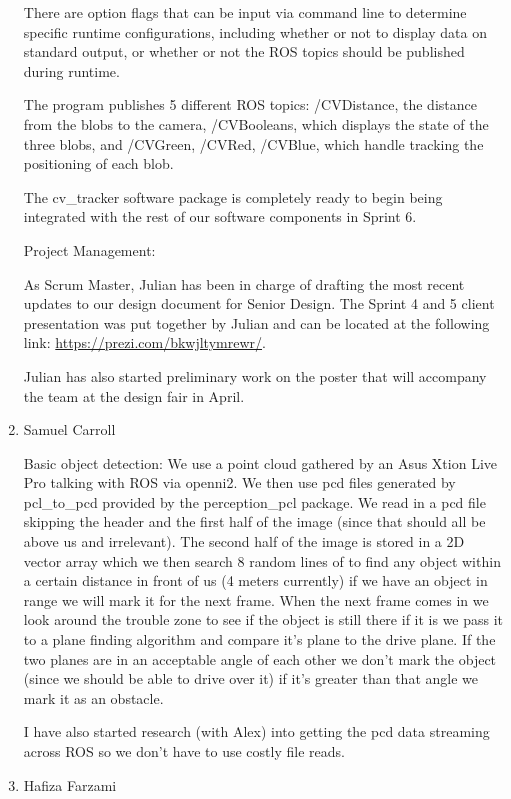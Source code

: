 \begin{enumerate}
There are option flags that can be input via command line to determine specific runtime configurations, including whether or not to display data on standard output, or whether or not the ROS topics should be published during runtime. 

The program publishes 5 different ROS topics:
/CVDistance, the distance from the blobs to the camera, /CVBooleans, which displays the state of the three blobs, and /CVGreen, /CVRed, /CVBlue, which handle tracking the positioning of each blob.

The cv\_tracker software package is completely ready to begin being integrated with the rest of our software components in Sprint 6.

Project Management:

As Scrum Master, Julian has been in charge of drafting the most recent updates to our design document for Senior Design. The Sprint 4 and 5 client presentation was put together by Julian and can be located at the following link: \url{https://prezi.com/bkwjltymrewr/}.

Julian has also started preliminary work on the poster that will accompany the team at the design fair in April.


\item Samuel Carroll

Basic object detection: We use a point cloud gathered by an Asus Xtion Live Pro talking with ROS via openni2. We then use pcd files generated by pcl\_to\_pcd provided by the perception\_pcl package. We read in a pcd file skipping the header and the first half of the image (since that should all be above us and irrelevant). The second half of the image is stored in a 2D vector array which we then search 8 random lines of to find any object within a certain distance in front of us (4 meters currently) if we have an object in range we will mark it for the next frame. When the next frame comes in we look around the trouble zone to see if the object is still there if it is we pass it to a plane finding algorithm and compare it's plane to the drive plane. If the two planes are in an acceptable angle of each other we don't mark the object (since we should be able to drive over it) if it's greater than that angle we mark it as an obstacle.

I have also started research (with Alex) into getting the pcd data streaming across ROS so we don't have to use costly file reads.

\item Hafiza Farzami


\end{enumerate}
